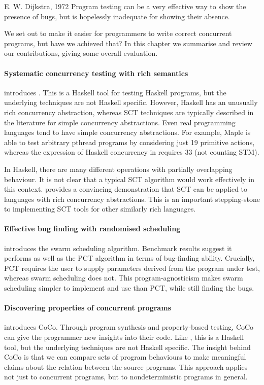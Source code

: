 \begin{bquote}{E. W. Dijkstra, 1972\nocite{ewd340}}
  Program testing can be a very effective way to show the presence of
  bugs, but is hopelessly inadequate for showing their absence.
\end{bquote}

\noindent
We set out to make it easier for programmers to write correct
concurrent programs, but have we achieved that?  In this chapter we
summarise and review our contributions, giving some overall
evaluation.

\paragraph{Systematic concurrency testing with rich semantics}
 introduces \dejafu{}.  This is a Haskell tool for
testing Haskell programs, but the underlying techniques are not
Haskell specific.  However, Haskell has an unusually rich concurrency
abstraction, whereas SCT techniques are typically described in the
literature for simple concurrency abstractions.  Even real programming
languages tend to have simple concurrency abstractions.  For example,
Maple\cite{yu2012} is able to test arbitrary pthread programs by
considering just 19 primitive actions, whereas the expression of
Haskell concurrency in \dejafu{} requires 33 (not counting STM).

In Haskell, there are many different operations with partially
overlapping behaviour.  It is not clear that a typical SCT algorithm
would work effectively in this context.  \dejafu{} provides a
convincing demonstration that SCT can be applied to languages with
rich concurrency abstractions.  This is an important stepping-stone to
implementing SCT tools for other similarly rich languages.

\paragraph{Effective bug finding with randomised scheduling}
 introduces the swarm scheduling algorithm.
Benchmark results suggest it performs as well as the PCT
algorithm\cite{burckhardt2010} in terms of bug-finding ability.
Crucially, PCT requires the user to supply parameters derived from the
program under test, whereas swarm scheduling does not.  This
program-agnosticism makes swarm scheduling simpler to implement and
use than PCT, while still finding the bugs.

\paragraph{Discovering properties of concurrent programs}
 introduces CoCo.  Through program synthesis and
property-based testing, CoCo can give the programmer new insights into
their code.  Like \dejafu{}, this is a Haskell tool, but the
underlying techniques are not Haskell specific.  The insight behind
CoCo is that we can compare sets of program behaviours to make
meaningful claims about the relation between the source programs.
This approach applies not just to concurrent programs, but to
nondeterministic programs in general.

